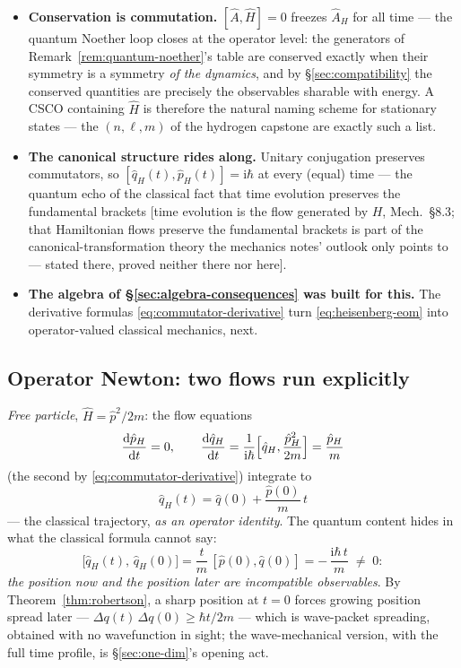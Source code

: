 \documentclass[11pt]{article}
\theoremstyle{plain}
\theoremstyle{definition}
\theoremstyle{remark}
\newcommand{\dd}{\mathrm{d}}
\newcommand{\ii}{\mathrm{i}}
\newcommand{\tot}[2]{\frac{\dd #1}{\dd #2}}
\newcommand{\op}[1]{\hat{#1}}
\begin{document}
\begin{itemize}
  \item \textbf{Conservation is commutation.} $[\op A, \op H] = 0$
  freezes $\op A_H$ for all time --- the quantum Noether loop closes
  at the operator level: the generators of
  Remark~\ref{rem:quantum-noether}'s table are conserved exactly
  when their symmetry is a symmetry \emph{of the dynamics}, and by
  \S\ref{sec:compatibility} the conserved quantities are precisely
  the observables sharable with energy. A CSCO containing $\op H$
  is therefore the natural naming scheme for stationary states ---
  the $(n, \ell, m)$ of the hydrogen capstone are exactly such a
  list.
  \item \textbf{The canonical structure rides along.} Unitary
  conjugation preserves commutators, so
  $[\op q_H(t), \op p_H(t)] = \ii\hbar$ at every (equal) time ---
  the quantum echo of the classical fact that time evolution
  preserves the fundamental brackets [time evolution is the flow
  generated by $H$, Mech.\ \S8.3; that Hamiltonian flows preserve
  the fundamental brackets is part of the canonical-transformation
  theory the mechanics notes' outlook only points to --- stated
  there, proved neither there nor here].
  \item \textbf{The algebra of \S\ref{sec:algebra-consequences} was
  built for this.} The derivative formulas
  \eqref{eq:commutator-derivative} turn \eqref{eq:heisenberg-eom}
  into operator-valued classical mechanics, next.
\end{itemize}

\subsection{Operator Newton: two flows run explicitly}
\label{sec:operator-newton}

\emph{Free particle}, $\op H = \op p^2/2m$: the flow equations
\begin{equation}
  \tot{\op p_H}t = 0,
  \qquad
  \tot{\op q_H}t
  = \frac{1}{\ii\hbar}\Bigl[\op q_H, \frac{\op p_H^2}{2m}\Bigr]
  = \frac{\op p_H}{m}
\end{equation}
(the second by \eqref{eq:commutator-derivative}) integrate to
\begin{equation}
  \op q_H(t) = \op q(0) + \frac{\op p(0)}{m}\,t
  \label{eq:free-trajectory}
\end{equation}
--- the classical trajectory, \emph{as an operator identity}. The
quantum content hides in what the classical formula cannot say:
\begin{equation}
  \bigl[\op q_H(t),\, \op q_H(0)\bigr]
  = \frac{t}{m}\,[\op p(0), \op q(0)]
  = -\,\frac{\ii\hbar\, t}{m}
  \;\ne\; 0 :
  \label{eq:position-noncommute}
\end{equation}
\emph{the position now and the position later are incompatible
observables}. By Theorem~\ref{thm:robertson}, a sharp position at
$t = 0$ forces growing position spread later ---
$\Delta q(t)\,\Delta q(0) \ge \hbar t/2m$ --- which is wave-packet
spreading, obtained with no wavefunction in sight; the
wave-mechanical version, with the full time profile, is
\S\ref{sec:one-dim}'s opening act.
\end{document}
